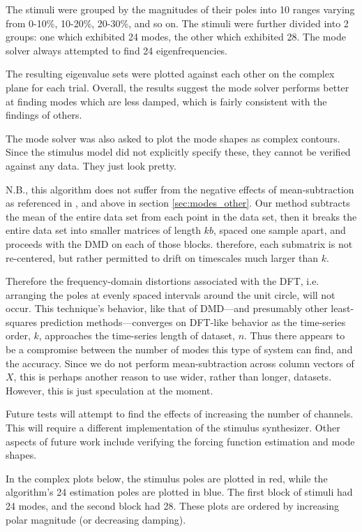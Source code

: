 \documentclass[a4paper,10pt]{report}
\numberwithin{equation}{section}
\begin{document}
The stimuli were grouped by the magnitudes of their poles into 10 ranges varying from 0-10\%, 10-20\%, 20-30\%, and so on. The stimuli were further divided into 2 groups: one which exhibited 24 modes, the other which exhibited 28. The mode solver always attempted to find 24 eigenfrequencies.

The resulting eigenvalue sets were plotted against each other on the complex plane for each trial. Overall, the results suggest the mode solver performs better at finding modes which are less damped, which is fairly consistent with the findings of others. \cite{Chen2012} \cite{Feeny1998} \cite{Kerschen2002} \cite{Han2003} 

The mode solver was also asked to plot the mode shapes as complex contours. Since the stimulus model did not explicitly specify these, they cannot be verified against any data. They just look pretty.

N.B., this algorithm does not suffer from the negative effects of mean-subtraction as referenced in \cite{Chen2012}, and above in section \ref{sec:modes_other}. Our method subtracts the mean of the entire data set from each point in the data set, then it breaks the entire data set into smaller matrices of length $kb$, spaced one sample apart, and proceeds with the DMD on each of those blocks. therefore, each submatrix is not re-centered, but rather permitted to drift on timescales much larger than $k$.

Therefore the frequency-domain distortions associated with the DFT, i.e. arranging the poles at evenly spaced intervals around the unit circle, will not occur. This technique's behavior, like that of DMD---and presumably other least-squares prediction methods---converges on DFT-like behavior as the time-series order, $k$, approaches the time-series length of dataset, $n$. Thus there appears to be a compromise between the number of modes this type of system can find, and the accuracy. Since we do not perform mean-subtraction across column vectors of $X$, this is perhaps another reason to use wider, rather than longer, datasets. However, this is just speculation at the moment.

Future tests will attempt to find the effects of increasing the number of channels. This will require a different implementation of the stimulus synthesizer. Other aspects of future work include verifying the forcing function estimation and mode shapes. 

In the complex plots below, the stimulus poles are plotted in red, while the algorithm's 24 estimation poles are plotted in blue. The first block of stimuli had 24 modes, and the second block had 28. These plots are ordered by increasing polar magnitude (or decreasing damping).
\end{document}
